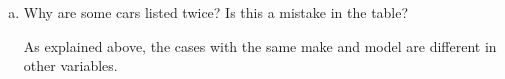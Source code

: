 \begin{enumerate}[(a)]
\item Why are some cars listed twice?  Is this a mistake in the table?

\begin{MultipleChoice}
\end{MultipleChoice}

\begin{AnswerText}
As explained above, the cases with the same make and model are
different in other variables.
\end{AnswerText}

\end{enumerate}

